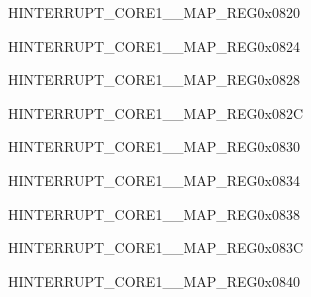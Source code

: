 \begin{register}{H}{INTERRUPT\_CORE1\_\_MAP\_REG}{0x0820}\label{regdesc:INTERRUPTCORE1RWBLEIRQMAPREG}
\end{register}
\vspace{-3em}

\begin{register}{H}{INTERRUPT\_CORE1\_\_MAP\_REG}{0x0824}\label{regdesc:INTERRUPTCORE1RWBTNMIMAPREG}
\end{register}
\vspace{-3em}

\begin{register}{H}{INTERRUPT\_CORE1\_\_MAP\_REG}{0x0828}\label{regdesc:INTERRUPTCORE1RWBLENMIMAPREG}
\end{register}
\vspace{-3em}

\begin{register}{H}{INTERRUPT\_CORE1\_\_MAP\_REG}{0x082C}\label{regdesc:INTERRUPTCORE1I2CMSTINTMAPREG}
\end{register}
\vspace{-3em}

\begin{register}{H}{INTERRUPT\_CORE1\_\_MAP\_REG}{0x0830}\label{regdesc:INTERRUPTCORE1SLC0INTRMAPREG}
\end{register}
\vspace{-3em}

\begin{register}{H}{INTERRUPT\_CORE1\_\_MAP\_REG}{0x0834}\label{regdesc:INTERRUPTCORE1SLC1INTRMAPREG}
\end{register}
\vspace{-3em}

\begin{register}{H}{INTERRUPT\_CORE1\_\_MAP\_REG}{0x0838}\label{regdesc:INTERRUPTCORE1UHCI0INTRMAPREG}
\end{register}
\vspace{-3em}

\begin{register}{H}{INTERRUPT\_CORE1\_\_MAP\_REG}{0x083C}\label{regdesc:INTERRUPTCORE1UHCI1INTRMAPREG}
\end{register}
\vspace{-3em}

\begin{register}{H}{INTERRUPT\_CORE1\_\_MAP\_REG}{0x0840}\label{regdesc:INTERRUPTCORE1GPIOINTERRUPTPROMAPREG}
\end{register}
\vspace{-3em}

